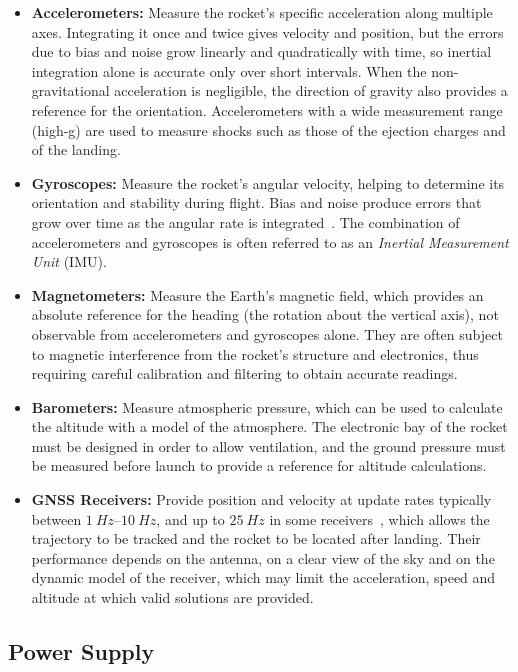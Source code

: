 \begin{itemize}
    \item \textbf{Accelerometers:} Measure the rocket's specific acceleration along multiple axes. Integrating it once and twice gives velocity and position, but the errors due to bias and noise grow linearly and quadratically with time, so inertial integration alone is accurate only over short intervals. When the non-gravitational acceleration is negligible, the direction of gravity also provides a reference for the orientation. Accelerometers with a wide measurement range (high-g) are used to measure shocks such as those of the ejection charges and of the landing. 
    \item \textbf{Gyroscopes:} Measure the rocket's angular velocity, helping to determine its orientation and stability during flight. Bias and noise produce errors that grow over time as the angular rate is integrated~\cite{titterton2004strapdown}. The combination of accelerometers and gyroscopes is often referred to as an \emph{Inertial Measurement Unit} (IMU).
    \item \textbf{Magnetometers:} Measure the Earth's magnetic field, which provides an absolute reference for the heading (the rotation about the vertical axis), not observable from accelerometers and gyroscopes alone. They are often subject to magnetic interference from the rocket's structure and electronics, thus requiring careful calibration and filtering to obtain accurate readings.
    \item \textbf{Barometers:} Measure atmospheric pressure, which can be used to calculate the altitude with a model of the atmosphere. The electronic bay of the rocket must be designed in order to allow ventilation, and the ground pressure must be measured before launch to provide a reference for altitude calculations.
    \item \textbf{GNSS Receivers:} Provide position and velocity at update rates typically between $\SIrange{1}{10}{Hz}$, and up to $\SI{25}{Hz}$ in some receivers~\cite{m9n:datasheet}, which allows the trajectory to be tracked and the rocket to be located after landing. Their performance depends on the antenna, on a clear view of the sky and on the dynamic model of the receiver, which may limit the acceleration, speed and altitude at which valid solutions are provided.
\end{itemize}

\subsection{Power Supply} 

